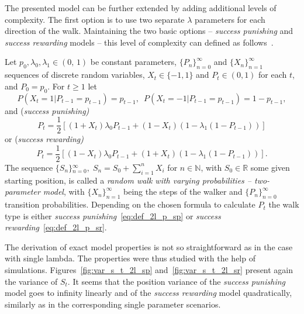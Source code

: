 \documentclass[runningheads]{CMSIM}
\begin{document}
    The presented model can be further extended by adding additional levels
    of complexity.
    The first option is to use two separate $\lambda$
    parameters for each direction of the walk.
    Maintaining the two basic
    options -- \emph{success punishing} and \emph{success rewarding} models --
    this level of complexity can defined as follows~\cite{ja2019apmat}.
    \begin{definition}
        Let $\ensuremath{p_{0},\lambda_{0},\lambda_{1}\in(0,\,1)}$ be constant
        parameters, ${\{P_{n}\}}_{n=0}^{\infty}$ and ${\{X_{n}\}}_{n=1}^{\infty}$
        sequences of discrete random variables, $X_t\in\{-1,1\}$ and $P_t\in(0,1)$ for each $t$, and $P_{0}=p_{0}$.
        For $t\ge1$ let
        \[
            P(X_{t}=1|P_{t-1}=p_{t-1})=p_{t-1},\,\,\,P(X_{t}=-1|P_{t-1}=p_{t-1})=1-p_{t-1},
        \]
        and (\emph{success punishing)}
        \begin{equation}
            P_{t}=\frac{1}{2}[(1+X_{t})\lambda_{0}P_{t-1}+(1-X_{t})(1-\lambda_{1}(1-P_{t-1}))]\label{eq:def_2l_p_sp}
        \end{equation}
        or (\emph{success rewarding)}
        \begin{equation}
            P_{t}=\frac{1}{2}[(1-X_{t})\lambda_{0}P_{t-1}+(1+X_{t})(1-\lambda_{1}(1-P_{t-1}))].\label{eq:def_2l_p_sr}
        \end{equation}
        The sequence ${\{S_{n}\}}{}_{n=0}^{\infty},\;S_{n}=S_{0}+\sum_{i=1}^{n}X_{i}$
        for $n\in\mathbb{N}$, with $S_{0}\in\mathbb{R}$ some given starting
        position, is called a \emph{random walk with varying probabilities
        -- two-parameter model}, with ${\{X_{n}\}}_{n=1}^{\infty}$ being the
        steps of the walker and ${\{P_{n}\}}_{n=0}^{\infty}$ transition probabilities.
        Depending on the chosen formula to calculate $P_{t}$ the walk type
        is either \emph{success punishing}~\eqref{eq:def_2l_p_sp} or \emph{success
        rewarding}~\eqref{eq:def_2l_p_sr}.

        The derivation of exact model properties is not so straightforward
        as in the case with single lambda.
        The properties were thus studied
        with the help of simulations.
        Figures~\ref{fig:var_s_t_2l_sp} and~\ref{fig:var_s_t_2l_sr} present again the variance of $S_{t}$.
        It seems that the position variance of the \emph{success punishing}
        model goes to infinity linearly and of the \emph{success rewarding}
        model quadratically, similarly as in the corresponding single parameter
        scenarios.


\end{definition}
\end{document}
